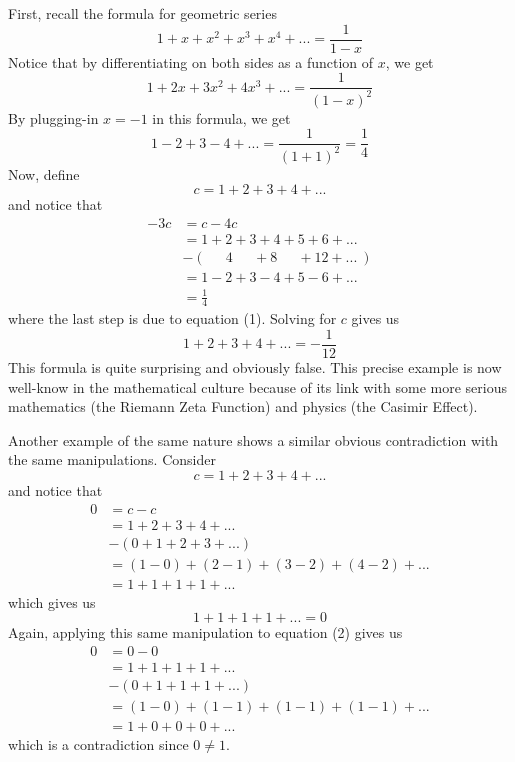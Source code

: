 \documentclass[12pt]{article}
\theoremstyle{definition}
\begin{document}

First, recall the formula for geometric series 
$$1 + x + x^2 + x^3 + x^4 + ... = \frac{1}{1-x}$$
Notice that by differentiating on both sides as a function of $x$, we get
$$1 + 2x + 3x^2 + 4x^3 + ... = \frac{1}{(1-x)^2}$$
By plugging-in $x = -1$ in this formula, we get
\[1 - 2 + 3 - 4 + ... = \frac{1}{(1 + 1)^2} = \frac{1}{4}\tag*{(1)} \]
Now, define
$$c = 1 + 2 + 3 + 4 + ...$$
and notice that
\begin{align*}
    -3c &= c - 4c \\
    &= 1 + 2 + 3 + 4 + 5 + 6 +... \\
    & - ( \quad \; \, 4 \quad \ \ + 8 \quad \ \ + 12 + ... \ ) \\
    &= 1 - 2 + 3 -4 + 5 - 6 + ... \\
    &= \frac{1}{4}
\end{align*}
where the last step is due to equation (1). Solving for $c$ gives us
$$1 + 2 + 3 + 4 + ... = - \frac{1}{12}$$
This formula is quite surprising and obviously false. This precise example is now well-know in the mathematical culture because of its link with some more serious mathematics (the Riemann Zeta Function) and physics (the Casimir Effect). 

Another example of the same nature shows a similar obvious contradiction with the same manipulations. Consider
$$c = 1 + 2 + 3 + 4 + ...$$
and notice that
\begin{align*}
    0 &= c-c \\
    &= 1 + 2 + 3 + 4 + ... \\
    & - (0 + 1 + 2 + 3 + ...) \\
    &= (1 - 0) + (2 - 1) + (3 - 2) + (4 - 2) + ... \\
    &= 1 + 1 + 1 + 1 + ...
\end{align*}
which gives us
\[1 + 1 + 1 + 1 + ... = 0 \tag*{(2)}\]
Again, applying this same manipulation to equation (2) gives us 
\begin{align*}
    0 &= 0-0 \\
    &= 1 + 1 + 1 + 1 + ... \\
    & - (0 + 1 + 1 + 1 + ...) \\
    &= (1 - 0) + (1 - 1) + (1 - 1) + (1 - 1) + ... \\
    &= 1 + 0 + 0 + 0 + ...
\end{align*}
which is a contradiction since $0 \neq 1$. 
\end{document}
